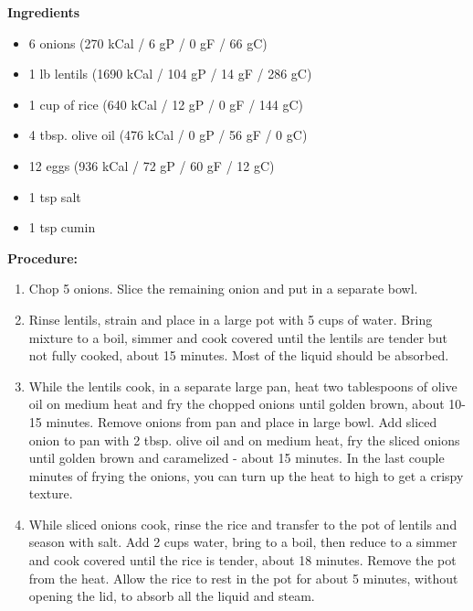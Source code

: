 \documentclass{report}
\begin{document}


\bigskip

\bigskip

\begin{multicols}{2}
\textbf{Ingredients}
\begin{itemize}


\item 6  onions \quad (270 kCal / 6 gP / 0 gF / 66 gC)
\item 1 lb lentils \quad (1690 kCal / 104 gP / 14 gF / 286 gC)
\item 1 cup of rice \quad (640 kCal / 12 gP / 0 gF / 144 gC)
\item 4 tbsp. olive oil \quad (476 kCal / 0 gP / 56 gF / 0 gC)
\item 12 eggs \quad (936 kCal / 72 gP / 60 gF / 12 gC)
\item 1 tsp salt 
\item 1 tsp cumin 



\end{itemize}


\columnbreak
\textbf{Procedure:}
\medskip


\begin{enumerate}
\item Chop 5 onions. Slice the remaining onion and put in a separate bowl. 
\medskip 
\item Rinse lentils, strain and place in a large pot with 5 cups of water. Bring mixture to a boil, simmer and cook covered until the lentils are tender but not fully cooked, about 15 minutes. Most of the liquid should be absorbed.
\medskip \item While the lentils cook, in a separate large pan, heat two tablespoons of olive oil on medium heat and fry the chopped onions until golden brown, about 10-15 minutes. Remove onions from pan and place in large bowl. Add sliced onion to pan with 2 tbsp. olive oil and on medium heat, fry the sliced onions until golden brown and caramelized - about 15 minutes. In the last couple minutes of frying the onions, you can turn up the heat to high to get a crispy texture.


\item While sliced onions cook, rinse the rice and transfer to the pot of lentils and season with salt. Add 2 cups water, bring to a boil, then reduce to a simmer and cook covered until the rice is tender, about 18 minutes. Remove the pot from the heat. Allow the rice to rest in the pot for about 5 minutes, without opening the lid, to absorb all the liquid and steam.


\end{enumerate}
\end{multicols}
\end{document}
